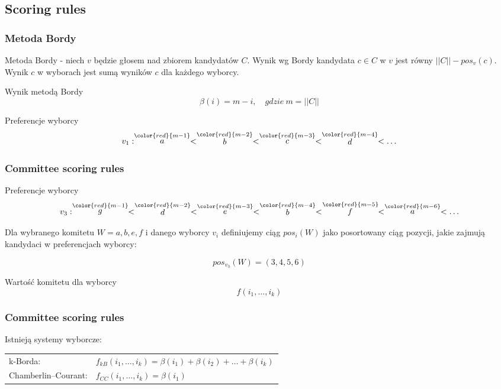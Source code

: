 \documentclass{beamer}
\newcommand{\red}[1]{
	{ \color{red}{#1} }
}
\newcommand{\score}[2]{
	\stackrel
	{\red{#1}}
	{#2}
}
\begin{document}
\subsection{Scoring rules}

\begin{frame}
\frametitle{Metoda Bordy}

Metoda Bordy -
niech $v$ będzie głosem nad zbiorem kandydatów $C$.
Wynik wg Bordy kandydata $c \in C$ w $v$ jest równy
$ ||C|| - pos_v(c) $.
Wynik $c$ w wyborach jest sumą wyników $c$ dla każdego wyborcy.

\begin{exampleblock}{Wynik metodą Bordy}
$$
\beta(i) = m-i, \quad gdzie \ m = ||C||
$$
\end{exampleblock}

\begin{exampleblock}{Preferencje wyborcy}
$$ 
v_1: \score{m-1}{a} < \score{m-2}{b} < \score{m-3}{c} < \score{m-4}{d} < \ldots
$$
\end{exampleblock}

\end{frame}


\begin{frame}
\frametitle{Committee scoring rules}

\begin{exampleblock}{Preferencje wyborcy}
$$
v_3: \score{m-1}{g} < \score{m-2}{d} < \score{m-3}{e} < \score{m-4}{b} < \score{m-5}{f} < \score{m-6}{a} < \ldots
$$
\end{exampleblock}

Dla wybranego komitetu $W = {a, b, e, f}$ i danego
wyborcy $v_i$ definiujemy ciąg $ pos_i(W) $ jako
posortowany ciąg pozycji, jakie zajmują kandydaci w preferencjach wyborcy:

$$pos_{v_3}(W) = (3, 4, 5, 6)$$

\begin{exampleblock}{Wartość komitetu dla wyborcy}
$$
f(i_1, \ldots, i_k)
$$
\end{exampleblock}

\end{frame}


\begin{frame}
\frametitle{Committee scoring rules}

Istnieją systemy wyborcze:

\begin{tabular}{ll}
k-Borda: 			& $f_{kB}(i_1, \ldots, i_k) = \beta(i_1) + \beta(i_2) + \ldots + \beta(i_k)$\\
Chamberlin–Courant:  & $f_{CC}(i_1, \ldots, i_k) = \beta(i_1)$
\end{tabular}

\end{frame}
\end{document}
